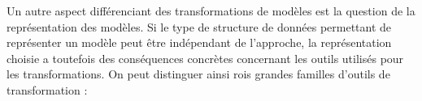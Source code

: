 %





Un autre aspect différenciant des transformations de modèles est la question de
la représentation des modèles. Si le type de structure de données permettant de
représenter un modèle peut être indépendant de l'approche, la
représentation choisie a toutefois des conséquences concrètes concernant les
outils utilisés pour les transformations. On peut distinguer ainsi rois grandes
familles d'outils de transformation :

